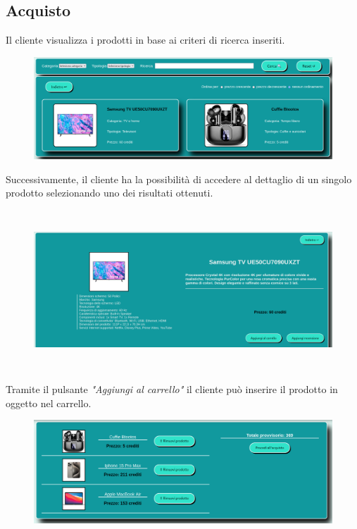 \documentclass[a4paper, 14pt]{article}
\begin{document}
\begin{flushleft}
				
			\subsection{Acquisto}
				Il cliente visualizza i prodotti in base ai criteri di ricerca inseriti.
				\begin{figure}[H]
					\includegraphics[width=\textwidth, frame=2pt]{"screenCatalogo.png"}	
				\end{figure}
				Successivamente, il cliente ha la possibilità di accedere al dettaglio di un singolo prodotto selezionando
				uno dei risultati ottenuti.
				\begin{figure}[H]
					\centering
					\includegraphics[height=6cm, frame=2pt]{"screenProdotto.png"}	
				\end{figure}
				Tramite il pulsante \textit{"Aggiungi al carrello"} il cliente può inserire il prodotto in oggetto nel carrello.
				\begin{figure}[H]
					\includegraphics[width=\textwidth, frame=2pt]{"screenCarrello.png"}	
				\end{figure}

\end{flushleft}
\end{document}
